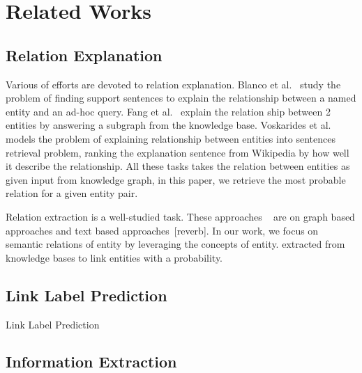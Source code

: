 \section{Related Works}





\subsection{Relation Explanation}


Various of efforts are devoted to relation explanation.
Blanco et al.~\cite{blanco2010finding} study the problem of finding support sentences to explain the relationship between a named entity and an ad-hoc query.
Fang et al.~\cite{fang2011rex} explain the relation ship between 2 entities by answering a subgraph from the knowledge base.
Voskarides et al.~\cite{voskarideslearning} models the problem of explaining relationship between entities into sentences retrieval problem, ranking the explanation sentence from Wikipedia by how well it describe the relationship.
All these tasks takes the relation between entities as given input from knowledge graph, in this paper, we retrieve the most probable relation for a given entity pair.

Relation extraction is a well-studied task.
These approaches 
~\cite{shahaf2010connecting,luo2007answering} are on graph based approaches and text based approaches~\cite{hasegawa2004discovering}[reverb].
In our work, we focus on semantic relations of entity by leveraging the concepts of entity. extracted from knowledge bases to link entities with a probability.


\subsection{Link Label Prediction}

Link Label Prediction~\cite{agrawal2013link} 

\subsection{Information Extraction}

